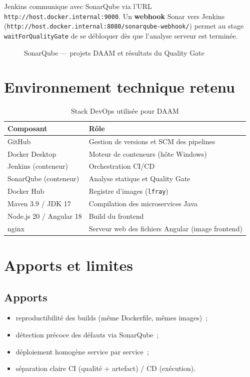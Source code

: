 Jenkins communique avec SonarQube via l'URL
\texttt{http://host.docker.internal:9000}. Un \textbf{webhook} Sonar
vers Jenkins
(\texttt{http://host.docker.internal:8080/sonarqube-webhook/})
permet au stage \texttt{waitForQualityGate} de se débloquer dès que
l'analyse serveur est terminée.

\begin{figure}[H]
  \centering
  \caption{SonarQube --- projets DAAM et résultats du Quality Gate}
  \label{fig:devops-sonar-projects}
\end{figure}


\section{Environnement technique retenu}

\begin{table}[htbp]
  \centering
  \small
  \caption{Stack DevOps utilisée pour DAAM}
  \label{tab:devops-stack}
  \begin{tabular}{|l|p{8.5cm}|}
    \hline
    \textbf{Composant} & \textbf{Rôle} \\
    \hline
    GitHub & Gestion de versions et SCM des pipelines \\
    Docker Desktop & Moteur de conteneurs (hôte Windows) \\
    Jenkins (conteneur) & Orchestration CI/CD \\
    SonarQube (conteneur) & Analyse statique et Quality Gate \\
    Docker Hub & Registre d'images (\texttt{lfray}) \\
    Maven 3.9 / JDK 17 & Compilation des microservices Java \\
    Node.js 20 / Angular 18 & Build du frontend \\
    nginx & Serveur web des fichiers Angular (image frontend) \\
    \hline
  \end{tabular}
\end{table}


\section{Apports et limites}

\subsection{Apports}
\begin{itemize}
  \item reproductibilité des builds (même Dockerfile, mêmes images)~;
  \item détection précoce des défauts via SonarQube~;
  \item déploiement homogène service par service~;
  \item séparation claire CI (qualité + artefact) / CD (exécution).
\end{itemize}

